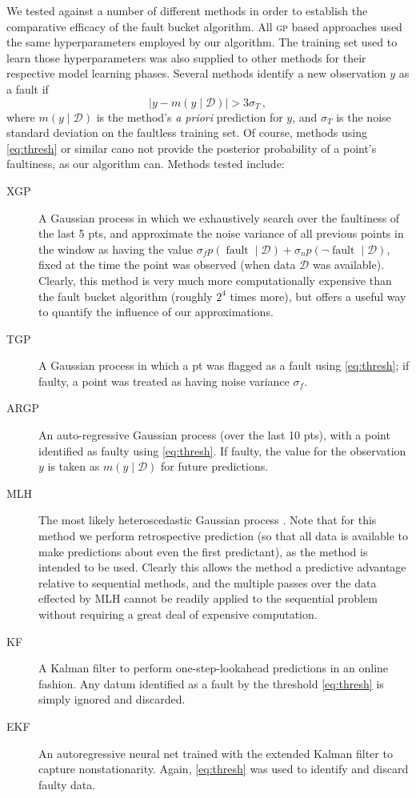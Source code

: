 \documentclass{article}
\newcommand{\given}{\ensuremath{\mid}}
\newcommand{\cm}[1]{\ensuremath{\mathcal{#1}}}
\newcommand{\data}{\ensuremath{\cm{D}}}
\newcommand{\acro}[1]{\textsc{#1}}
\newcommand{\p}[2]{p(#1\given#2)}
\newcommand{\mean}[2]{{m}(#1\given#2)}
\DeclareMathOperator{\fault}{fault}
\begin{document}
We tested against a number of different methods in order to establish the comparative efficacy of the fault bucket algorithm. All \acro{gp} based approaches used the same hyperparameters employed by our algorithm. The training set used to learn those hyperparameters was also supplied to other methods for their respective model learning phases. Several methods identify a new observation $y$ as a fault if
\begin{equation}\label{eq:thresh}
 |y-\mean{y}{\data}|>3\sigma_T\,,
\end{equation}
where $\mean{y}{\data}$ is the method's \emph{a priori} prediction for $y$, and $\sigma_T$ is the noise standard deviation on the faultless training set. Of course, methods using \eqref{eq:thresh} or similar cano not provide the posterior probability of a point's faultiness, as our algorithm can. Methods tested include:
\begin{description}
\item[ XGP] A Gaussian process in which we exhaustively search over the faultiness of the last 5 pts, and approximate the noise variance of all previous points in the window as having the value $\sigma_f \p{\fault}{\data} + \sigma_n \p{\neg\fault}{\data}$, fixed at the time the point was observed (when data $\data$ was available). Clearly, this method is very much more computationally expensive than the fault bucket algorithm (roughly $2^4$ times more), but offers a useful way to quantify the influence of our approximations.
 \item[ TGP] A Gaussian process in which a pt was flagged as a fault using \eqref{eq:thresh}; if faulty, a point was treated as having noise variance $\sigma_f$.
 \item[ ARGP] An auto-regressive Gaussian process (over the last 10 pts), with a point identified as faulty using \eqref{eq:thresh}. If faulty, the value for the observation $y$ is taken as $\mean{y}{\data}$ for future predictions.
\item[MLH] The most likely heteroscedastic Gaussian process \citep{kersting2007most}. Note that for this method we perform retrospective prediction (so that all data is available to make predictions about even the first predictant), as the method is intended to be used. Clearly this allows the method a predictive advantage relative to sequential methods, and the multiple passes over the data effected by \acro{MLH} cannot be readily applied to the sequential problem without requiring a great deal of expensive computation. 
 \item[KF] A Kalman filter to perform one-step-lookahead predictions in an online fashion. Any datum identified as a fault by the threshold \eqref{eq:thresh} is simply ignored and discarded.
\item[EKF] An autoregressive neural net trained with the extended Kalman filter to capture nonstationarity. Again, \eqref{eq:thresh} was used to identify and discard faulty data.
\end{description}
\end{document}
